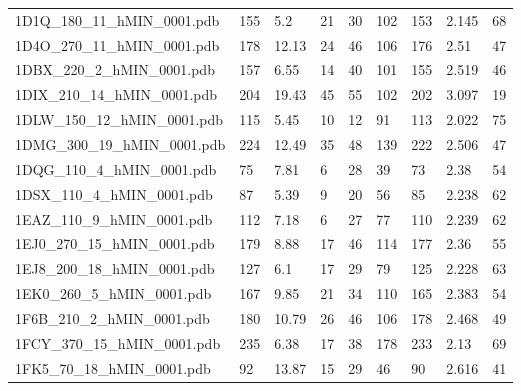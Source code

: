 \documentclass{bioinfo}
\begin{document}
\begin{table*}[!t]
{\begin{tabular}{lllllllll}
    1D1Q\_180\_11\_hMIN\_0001.pdb & 155      & 5.2        & 21          & 30          & 102         & 153     & 2.145           & 68           \\
    1D4O\_270\_11\_hMIN\_0001.pdb & 178      & 12.13      & 24          & 46          & 106         & 176     & 2.51            & 47           \\
    1DBX\_220\_2\_hMIN\_0001.pdb & 157      & 6.55       & 14          & 40          & 101         & 155     & 2.519           & 46           \\
    1DIX\_210\_14\_hMIN\_0001.pdb & 204      & 19.43      & 45          & 55          & 102         & 202     & 3.097           & 19           \\
    1DLW\_150\_12\_hMIN\_0001.pdb & 115      & 5.45       & 10          & 12          & 91          & 113     & 2.022           & 75           \\
    1DMG\_300\_19\_hMIN\_0001.pdb & 224      & 12.49      & 35          & 48          & 139         & 222     & 2.506           & 47           \\
    1DQG\_110\_4\_hMIN\_0001.pdb & 75       & 7.81       & 6           & 28          & 39          & 73      & 2.38            & 54           \\
    1DSX\_110\_4\_hMIN\_0001.pdb & 87       & 5.39       & 9           & 20          & 56          & 85      & 2.238           & 62           \\
    1EAZ\_110\_9\_hMIN\_0001.pdb & 112      & 7.18       & 6           & 27          & 77          & 110     & 2.239           & 62           \\
    1EJ0\_270\_15\_hMIN\_0001.pdb & 179      & 8.88       & 17          & 46          & 114         & 177     & 2.36            & 55           \\
    1EJ8\_200\_18\_hMIN\_0001.pdb & 127      & 6.1        & 17          & 29          & 79          & 125     & 2.228           & 63           \\
    1EK0\_260\_5\_hMIN\_0001.pdb & 167      & 9.85       & 21          & 34          & 110         & 165     & 2.383           & 54           \\
    1F6B\_210\_2\_hMIN\_0001.pdb & 180      & 10.79      & 26          & 46          & 106         & 178     & 2.468           & 49           \\
    1FCY\_370\_15\_hMIN\_0001.pdb & 235      & 6.38       & 17          & 38          & 178         & 233     & 2.13            & 69           \\
    1FK5\_70\_18\_hMIN\_0001.pdb & 92       & 13.87      & 15          & 29          & 46          & 90      & 2.616           & 41           \\

\end{tabular}}
\end{table*}
\end{document}
